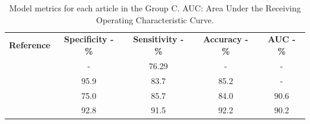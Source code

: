 \documentclass{article}
\begin{document}
\begin{table}[]
    \centering
    \begin{tabular}{ccccc}\toprule
        \multirow{2}{*}{\textbf{Reference}} & \multirow{2}{*}{\textbf{Specificity - \%}} & \multirow{2}{*}{\textbf{Sensitivity - \%}} & \multirow{2}{*}{\textbf{Accuracy - \%}} & \multirow{2}{*}{\textbf{AUC - \%}} \\
        \\\midrule
        \cite{Bi2017}                       & -                                          & 76.29                                      & -                                       & -                                  \\
        \cite{Bi2022}                       & 95.9                                       & 83.7                                       & 85.2                                    & -                                  \\
        \cite{Kong2022}                     & 75.0                                       & 85.7                                       & 84.0                                    & 90.6                               \\
        \cite{Zheng2020}                    & 92.8                                       & 91.5                                       & 92.2                                    & 90.2                               \\
        \bottomrule
    \end{tabular}
    \caption{Model metrics for each article in the Group C. AUC: Area Under the Receiving Operating Characteristic Curve.}
    \label{tab:res_C}
\end{table}

% 
% 
\printbibliography
\end{document}
